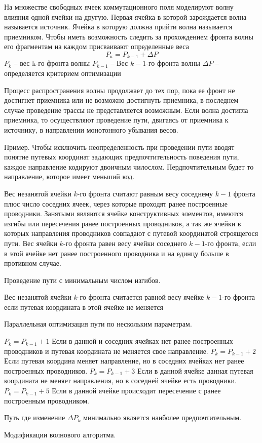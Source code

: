 \documentclass{article}
\begin{document}
На множестве свободных ячеек коммутационного поля моделируют волну влияния одной ячейки на другую. Первая ячейка в которой зарождается волна называется источник. Ячейка в которую должна прийти волна называется приемником.
Чтобы иметь возможность следить за прохождением фронта волны его фрагментам на каждом присваивают определенные веса
$$
P_к = P_{k-1} + \Delta P
$$
$P_k$ -- вес k-го фронта волны
$P_{k-1}$ -- Вес $k - 1$-го фронта волны
$ \Delta P$ -- определяется критерием оптимизации

Процесс распространения волны продолжает до тех пор, пока ее фронт не достигнет приемника или не возможно достигнуть приемника, в последнем случае проведение трассы не представляется возможным. Если волна достигла приемника, то осуществляют проведение пути, двигаясь от приемника к источнику, в направлении монотонного убывания весов.

Пример.
Чтобы исключить неопределенность при проведении пути вводят понятие путевых координат задающих предпочтительность поведения пути, каждое направление кодируют двоичным чилослом. Пердпочтительным будет то направление, которое имеет меньший код.

Вес незанятой ячейки $k$-го фронта считают равным весу соседнему $k-1$ фронта плюс число соседних ячеек, через которые проходят ранее построенные проводники.
Занятыми являются ячейке конструктивных элементов, имеются изгибы или пересечения ранее построенных проводников, а так же ячейки в которых направления проводников совпадают с путевой координатой строящегося пути. Вес ячейки $k$-го фронта равен весу ячейки соседнего $k-1$-го фронта, если в этой ячейке нет ранее построенного проводника и на единцу больше в противном случае.

Проведение пути с минимальным числом изгибов.

Вес незанятой ячейки $k$-го фронта считается равной весу ячейке $k-1$-го фронта если путевая координата в этой ячейке не меняется

Параллельная оптимизация пути по нескольким параметрам.

$P_k = P_{k - 1} + 1$ Если в данной и соседних ячейках нет ранее построенных проводников и путевая координата не меняется свое направление.
$P_k = P_{k-1} + 2$ Если путевая координа меняет направление, но в соседних ячейках нет ранее построенных проводников.
$P_k = P_{k-1} + 3$ Если в данной ячейке данная путевая координата не меняет направления, но в соседней ячейке есть проводники.
$P_k = P_{k-1} + 5$ Если в данной ячейке происходит пересечение с ранее построенным проводником.

Путь где изменение $ \Delta P_k$ минимально является наиболее предпочтительным.

Модификации волнового алгоритма.
\end{document}
